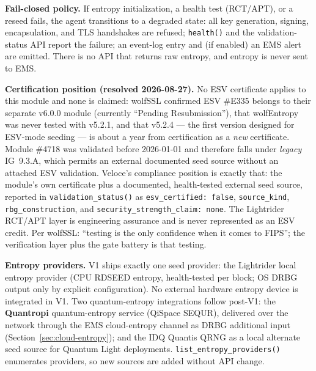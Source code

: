 \documentclass[10pt]{article}
\newcommand{\code}[1]{\texttt{\small #1}}
\begin{document}
\textbf{Fail-closed policy.} If entropy initialization, a health test (RCT/APT), or a
reseed fails, the agent transitions to a degraded state: all key generation, signing,
encapsulation, and TLS handshakes are refused; \code{health()} and the validation-status
API report the failure; an event-log entry and (if enabled) an EMS alert are emitted.
There is no API that returns raw entropy, and entropy is never sent to EMS.

\textbf{Certification position (resolved 2026-08-27).} No ESV certificate applies to
this module and none is claimed: wolfSSL confirmed ESV \#E335 belongs to their separate
v6.0.0 module (currently ``Pending Resubmission''), that wolfEntropy was never tested
with v5.2.1, and that v5.2.4 --- the first version designed for ESV-mode seeding --- is
about a year from certification as a \emph{new} certificate. Module \#4718 was validated
before 2026-01-01 and therefore falls under \emph{legacy} IG~9.3.A, which permits an
external documented seed source without an attached ESV validation. Veloce's compliance
position is exactly that: the module's own certificate plus a documented, health-tested
external seed source, reported in \code{validation\_status()} as
\code{esv\_certified:\ false}, \code{source\_kind}, \code{rbg\_construction}, and
\code{security\_strength\_claim:\ none}. The Lightrider RCT/APT layer is engineering
assurance and is never represented as an ESV credit. Per wolfSSL: ``testing is the only confidence when it comes to FIPS''; the
verification layer plus the gate battery is that testing.

\textbf{Entropy providers.} V1 ships exactly one seed provider: the Lightrider local
entropy provider (CPU RDSEED entropy, health-tested per block; OS DRBG output only by
explicit configuration). No external hardware entropy device is integrated in V1. Two quantum-entropy integrations follow post-V1: the
\textbf{Quantropi} quantum-entropy service (QiSpace SEQUR), delivered over the network
through the EMS cloud-entropy channel as DRBG additional input
(Section~\ref{sec:cloud-entropy}); and the IDQ Quantis QRNG as a local alternate seed
source for Quantum Light deployments.
\code{list\_entropy\_providers()} enumerates providers, so new sources are added without
API change.
\end{document}
